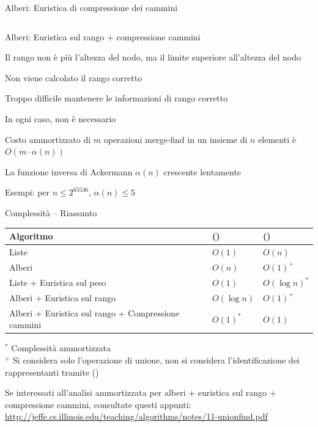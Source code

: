 \begin{frame}{Alberi: Euristica di compressione dei cammini}
\begin{columns}[T]
\end{columns}
\end{frame}


\begin{frame}{Alberi: Euristica sul rango + compressione cammini}

\vspace{-9pt}
\begin{myboxtitle}
\BIL
\item Il rango non è più l'altezza del nodo, ma il \alert{limite superiore} all'altezza del nodo
\item \alert{Non} viene calcolato il rango corretto
\BI
\item Troppo difficile mantenere le informazioni di rango corretto
\item In ogni caso, non è necessario
\EI
\EIL
\end{myboxtitle}

\begin{myboxtitle}[Complessità]
\BIL 
\item Costo ammortizzato di $m$ operazioni merge-find in un insieme di $n$
elementi è $O(m \cdot \alpha(n))$
\item  La \alert{funzione inversa di Ackermann $\alpha(n)$} crescente lentamente
\item Esempi: per $n \leq 2^{65536}$, $\alpha(n) \leq 5$
\EIL
\end{myboxtitle}

\end{frame}

\begin{frame}{Complessità -- Riassunto}

\begin{tabular}{|P{6cm}|l|l|}
\hline
\textbf{Algoritmo} & () & () \\\hline
Liste  & $O(1)$ & $O(n)$ \\\hline
Alberi & $O(n)$ & $O(1)^+$ \\\hline
Liste + Euristica sul peso & $O(1)$ & $O(\log n)^*$ \\\hline
Alberi + Euristica sul rango & $O(\log n)$ & $O(1)^+$ \\\hline
Alberi + Euristica sul rango +
Compressione cammini & $O(1)^*$ & $O(1)$ \\\hline
\end{tabular}

\bigskip
$^*$ Complessità ammortizzata\\
$^+$ Si considera solo l'operazione di unione, non si considera l'identificazione dei rappresentanti tramite ()

\bigskip
Se interessati all'analisi ammortizzata per alberi + euristica sul rango + compressione cammini, consultate questi appunti:\\

\medskip
\footnotesize
\url{http://jeffe.cs.illinois.edu/teaching/algorithms/notes/11-unionfind.pdf}


\end{frame}


